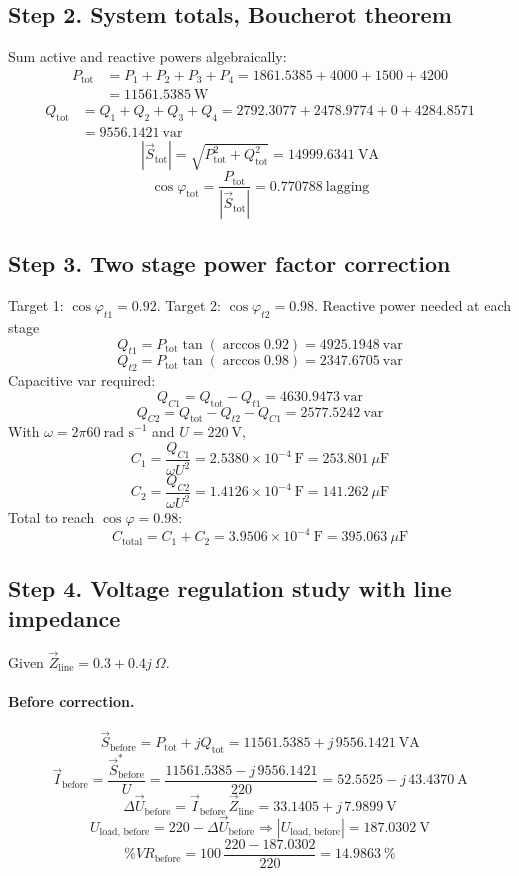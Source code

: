 \documentclass[a4paper,12pt]{article}
\begin{document}
\subsection*{Step 2. System totals, Boucherot theorem}
Sum active and reactive powers algebraically:
\[
\begin{aligned}
P_{\text{tot}} &= P_1+P_2+P_3+P_4
= 1861.5385 + 4000 + 1500 + 4200 \\
&= \boxed{11561.5385\ \text{W}}
\end{aligned}
\]
\[
\begin{aligned}
Q_{\text{tot}} &= Q_1+Q_2+Q_3+Q_4
= 2792.3077 + 2478.9774 + 0 + 4284.8571 \\
&= \boxed{9556.1421\ \text{var}}
\end{aligned}
\]
\[
|\vec S_{\text{tot}}| = \sqrt{P_{\text{tot}}^2 + Q_{\text{tot}}^2}
= \boxed{14999.6341\ \text{VA}}
\]
\[
\boxed{\cos\varphi_{\text{tot}} = \frac{P_{\text{tot}}}{|\vec S_{\text{tot}}|}
= 0.770788\ \text{lagging}}
\]

\subsection*{Step 3. Two stage power factor correction}
Target 1: \(\cos\varphi_{t1}=0.92\).  
Target 2: \(\cos\varphi_{t2}=0.98\).  
Reactive power needed at each stage
\[
Q_{t1} = P_{\text{tot}}\tan(\arccos 0.92) 
= \boxed{4925.1948\ \text{var}}
\]
\[
Q_{t2} = P_{\text{tot}}\tan(\arccos 0.98)
= \boxed{2347.6705\ \text{var}}
\]
Capacitive var required:
\[
Q_{C1} = Q_{\text{tot}} - Q_{t1}
= \boxed{4630.9473\ \text{var}}
\]
\[
Q_{C2} = Q_{\text{tot}} - Q_{t2} - Q_{C1}
= \boxed{2577.5242\ \text{var}}
\]
With \( \omega = 2\pi 60\ \text{rad s}^{-1} \) and \( U=220\ \text{V} \),
\[
C_1 = \frac{Q_{C1}}{\omega U^2}
= \boxed{2.5380\times 10^{-4}\ \text{F}} 
= \boxed{253.801\ \mu\text{F}}
\]
\[
C_2 = \frac{Q_{C2}}{\omega U^2}
= \boxed{1.4126\times 10^{-4}\ \text{F}} 
= \boxed{141.262\ \mu\text{F}}
\]
Total to reach \(\cos\varphi=0.98\):
\[
C_{\text{total}} = C_1 + C_2 
= \boxed{3.9506\times 10^{-4}\ \text{F}}
= \boxed{395.063\ \mu\text{F}}
\]

\subsection*{Step 4. Voltage regulation study with line impedance}
Given \( \vec Z_{\text{line}} = 0.3 + 0.4j\ \Omega \).

\paragraph{Before correction.}
\[
\vec S_{\text{before}} = P_{\text{tot}} + jQ_{\text{tot}}
= 11561.5385 + j\,9556.1421\ \text{VA}
\]
\[
\vec I_{\text{before}} = \frac{\vec S_{\text{before}}^{\ast}}{U}
= \frac{11561.5385 - j\,9556.1421}{220}
= 52.5525 - j\,43.4370\ \text{A}
\]
\[
\Delta \vec U_{\text{before}} = \vec I_{\text{before}}\,\vec Z_{\text{line}}
= 33.1405 + j\,7.9899\ \text{V}
\]
\[
U_{\text{load, before}} = 220 - \Delta \vec U_{\text{before}}
\Rightarrow |U_{\text{load, before}}| = \boxed{187.0302\ \text{V}}
\]
\[
\%VR_{\text{before}} = 100\,\frac{220 - 187.0302}{220}
= \boxed{14.9863\ \%}
\]
\end{document}
